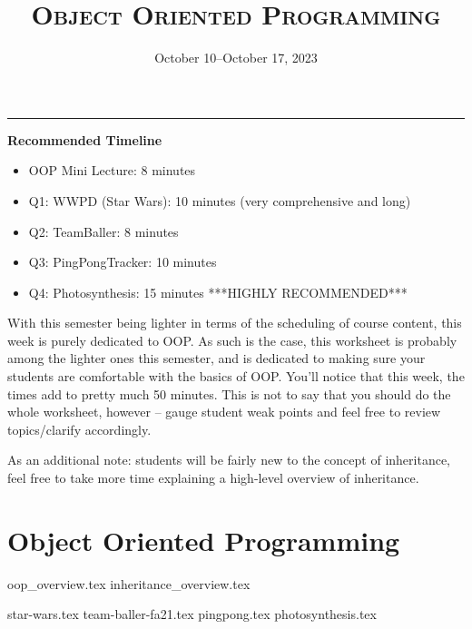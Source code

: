 \documentclass{exam}
\title{\textsc{Object Oriented Programming}}
\date{October 10--October 17, 2023}
\begin{document}
	\maketitle
	\rule{\textwidth}{0.15em}

\begin{meta}
	\textbf{Recommended Timeline}
	\begin{itemize}
		\item OOP Mini Lecture: 8 minutes
		\item Q1: WWPD (Star Wars): 10 minutes (very comprehensive and long)
		\item Q2: TeamBaller: 8 minutes
        \item Q3: PingPongTracker: 10 minutes
		\item Q4: Photosynthesis: 15 minutes ***HIGHLY RECOMMENDED*** 
	\end{itemize}
With this semester being lighter in terms of the scheduling of course content, this week is purely dedicated to OOP. As such is the case, this worksheet is probably among the lighter ones this semester, and is dedicated to making sure your students are comfortable with the basics of OOP. You'll notice that this week, the times add to pretty much 50 minutes. This is not to say that you should do the whole worksheet, however -- gauge student weak points and feel free to review topics/clarify accordingly.

As an additional note: students will be fairly new to the concept of inheritance, feel free to take more time explaining a high-level overview of inheritance. 
\end{meta}

\section{Object Oriented Programming}
{oop_overview.tex}
{inheritance_overview.tex}
\newpage
\begin{questions}
{star-wars.tex}
\newpage
{team-baller-fa21.tex}
\newpage
{pingpong.tex}
\newpage
{photosynthesis.tex}
\end{questions}
\end{document}
